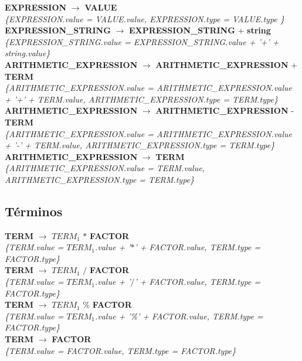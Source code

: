 \documentclass[10pt,a4paper]{article}
\begin{document}
\textbf{EXPRESSION} $\rightarrow$ \textbf{VALUE} \\
\textit{\{EXPRESSION.value =  VALUE.value, EXPRESSION.type = VALUE.type \}} \\

\textbf{EXPRESSION\_STRING} $\rightarrow$ \textbf{EXPRESSION\_STRING} + \textbf{string} \\ \textit{\{EXPRESSION\_STRING.value =  EXPRESSION\_STRING.value + '+' + string.value\}} \\

\textbf{ARITHMETIC\_EXPRESSION} $\rightarrow$ \textbf{ARITHMETIC\_EXPRESSION} + \textbf{TERM} \\
\textit{\{ARITHMETIC\_EXPRESSION.value =  ARITHMETIC\_EXPRESSION.value + '+' + TERM.value, ARITHMETIC\_EXPRESSION.type = TERM.type\}} \\

\textbf{ARITHMETIC\_EXPRESSION} $\rightarrow$ \textbf{ARITHMETIC\_EXPRESSION} - \textbf{TERM}  \\
\textit{\{ARITHMETIC\_EXPRESSION.value =  ARITHMETIC\_EXPRESSION.value + '-' + TERM.value, ARITHMETIC\_EXPRESSION.type = TERM.type\}} \\

\textbf{ARITHMETIC\_EXPRESSION} $\rightarrow$ \textbf{TERM} \\
\textit{\{ARITHMETIC\_EXPRESSION.value = TERM.value, ARITHMETIC\_EXPRESSION.type = TERM.type\}}  \\

\subsection{Términos}
\textbf{TERM} $\rightarrow$ \textbf{$TERM_{1}$} $*$ \textbf{FACTOR}   \\
\textit{\{TERM.value = $TERM_{1}$.value + '$*$' + FACTOR.value, TERM.type = FACTOR.type\}} \\

\textbf{TERM} $\rightarrow$ \textbf{$TERM_{1}$} $/$ \textbf{FACTOR}   \\
\textit{\{TERM.value = $TERM_{1}$.value + '$/$' + FACTOR.value, TERM.type = FACTOR.type\}} \\

\textbf{TERM} $\rightarrow$ \textbf{$TERM_{1}$} \% \textbf{FACTOR}  \\
\textit{\{TERM.value = $TERM_{1}$.value + '\%' + FACTOR.value, TERM.type = FACTOR.type\}} \\

\textbf{TERM} $\rightarrow$ \textbf{FACTOR} \\
\textit{\{TERM.value = FACTOR.value, TERM.type = FACTOR.type\}} \\
\end{document}
